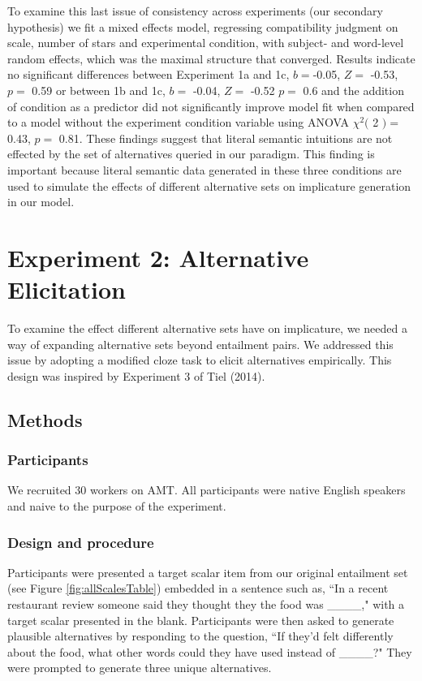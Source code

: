 \documentclass[10pt, letterpaper]{article}
\begin{document}
To examine this last issue of consistency across experiments (our
secondary hypothesis) we fit a mixed effects model, regressing
compatibility judgment on scale, number of stars and experimental
condition, with subject- and word-level random effects, which was the
maximal structure that converged. Results indicate no significant
differences between Experiment 1a and 1c, \(b =\)-0.05, \(Z =\) -0.53,
\(p =\) 0.59 or between 1b and 1c, \(b =\) -0.04, \(Z =\) -0.52 \(p =\)
0.6 and the addition of condition as a predictor did not significantly
improve model fit when compared to a model without the experiment
condition variable using ANOVA \(\chi^2(\) 2 \() =\) 0.43, \(p =\) 0.81.
These findings suggest that literal semantic intuitions are not effected
by the set of alternatives queried in our paradigm. This finding is
important because literal semantic data generated in these three
conditions are used to simulate the effects of different alternative
sets on implicature generation in our model.

\section{Experiment 2: Alternative
Elicitation}\label{experiment-2-alternative-elicitation}

To examine the effect different alternative sets have on implicature, we
needed a way of expanding alternative sets beyond entailment pairs. We
addressed this issue by adopting a modified cloze task to elicit
alternatives empirically. This design was inspired by Experiment 3 of
Tiel (2014).

\subsection{Methods}\label{methods-1}

\subsubsection{Participants}\label{participants-1}

We recruited 30 workers on AMT. All participants were native English
speakers and naive to the purpose of the experiment.

\subsubsection{Design and procedure}\label{design-and-procedure-1}

Participants were presented a target scalar item from our original
entailment set (see Figure \ref{fig:allScalesTable}) embedded in a
sentence such as, ``In a recent restaurant review someone said they
thought they the food was \_\_\_\_," with a target scalar presented in
the blank. Participants were then asked to generate plausible
alternatives by responding to the question, ``If they'd felt differently
about the food, what other words could they have used instead of
\_\_\_\_?" They were prompted to generate three unique alternatives.
\end{document}
